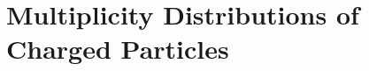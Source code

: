 \chapter{Multiplicity Distributions of Charged Particles} %
\label{Charged particle multiplicity unfolding}







%
%
%
%
%
%
%
%

